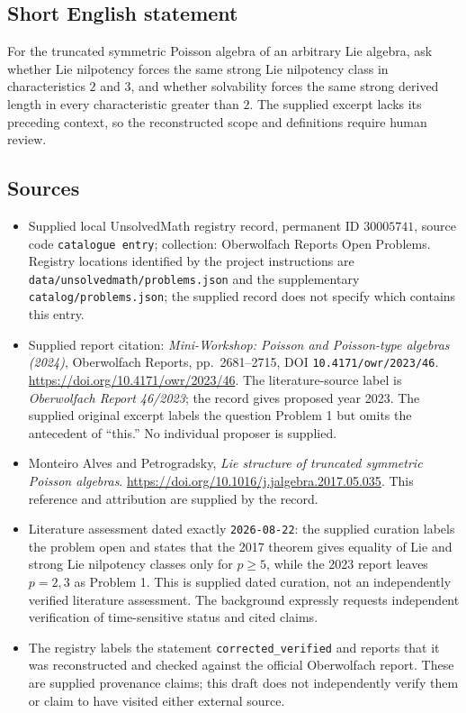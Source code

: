\documentclass[11pt]{article}
\begin{document}
\subsection{Short English statement}
For the truncated symmetric Poisson algebra of an arbitrary Lie algebra, ask whether Lie nilpotency forces the same strong Lie nilpotency class in characteristics \(2\) and \(3\), and whether solvability forces the same strong derived length in every characteristic greater than \(2\). The supplied excerpt lacks its preceding context, so the reconstructed scope and definitions require human review.
\subsection{Sources}
\begin{itemize}
\item Supplied local UnsolvedMath registry record, permanent ID \(30005741\), source code \texttt{catalogue entry}; collection: Oberwolfach Reports Open Problems. Registry locations identified by the project instructions are \texttt{data/unsolvedmath/problems.json} and the supplementary \texttt{catalog/problems.json}; the supplied record does not specify which contains this entry.
\item Supplied report citation: \emph{Mini-Workshop: Poisson and Poisson-type algebras (2024)}, Oberwolfach Reports, pp.\ 2681--2715, DOI \texttt{10.4171/owr/2023/46}. \url{https://doi.org/10.4171/owr/2023/46}. The literature-source label is \emph{Oberwolfach Report 46/2023}; the record gives proposed year 2023. The supplied original excerpt labels the question Problem 1 but omits the antecedent of ``this.'' No individual proposer is supplied.
\item Monteiro Alves and Petrogradsky, \emph{Lie structure of truncated symmetric Poisson algebras}. \url{https://doi.org/10.1016/j.jalgebra.2017.05.035}. This reference and attribution are supplied by the record.
\item Literature assessment dated exactly \texttt{2026-08-22}: the supplied curation labels the problem open and states that the 2017 theorem gives equality of Lie and strong Lie nilpotency classes only for \(p\geq5\), while the 2023 report leaves \(p=2,3\) as Problem 1. This is supplied dated curation, not an independently verified literature assessment. The background expressly requests independent verification of time-sensitive status and cited claims.
\item The registry labels the statement \texttt{corrected\_verified} and reports that it was reconstructed and checked against the official Oberwolfach report. These are supplied provenance claims; this draft does not independently verify them or claim to have visited either external source.
\end{itemize}
\end{document}
